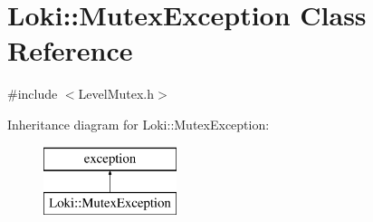 \hypertarget{classLoki_1_1MutexException}{}\section{Loki\+:\+:Mutex\+Exception Class Reference}
\label{classLoki_1_1MutexException}


{\ttfamily \#include $<$Level\+Mutex.\+h$>$}

Inheritance diagram for Loki\+:\+:Mutex\+Exception\+:\begin{figure}[H]
\begin{center}
\leavevmode
\includegraphics[height=2.000000cm]{classLoki_1_1MutexException}
\end{center}
\end{figure}
